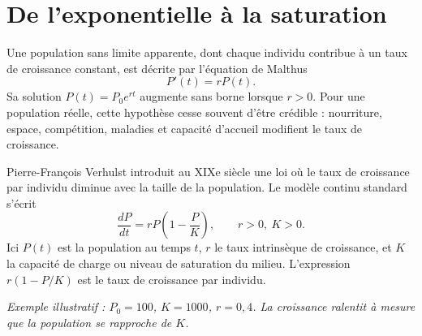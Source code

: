 


\section*{De l'exponentielle à la saturation}
Une population sans limite apparente, dont chaque individu contribue à un taux de croissance constant, est décrite par l'équation de Malthus
\[
 P'(t)=rP(t).
\]
Sa solution $P(t)=P_0e^{rt}$ augmente sans borne lorsque $r>0$. Pour une population réelle, cette hypothèse cesse souvent d'être crédible : nourriture, espace, compétition, maladies et capacité d'accueil modifient le taux de croissance.

Pierre-François Verhulst introduit au XIXe siècle une loi où le taux de croissance par individu diminue avec la taille de la population. Le modèle continu standard s'écrit
\begin{equation}\label{eq:logistic}
 \boxed{\frac{dP}{dt}=rP\left(1-\frac{P}{K}\right)},\qquad r>0,\ K>0.
\end{equation}
Ici $P(t)$ est la population au temps $t$, $r$ le taux intrinsèque de croissance, et $K$ la capacité de charge ou niveau de saturation du milieu. L'expression $r(1-P/K)$ est le taux de croissance par individu.

\begin{center}
\end{center}
\textit{Exemple illustratif : $P_0=100$, $K=1000$, $r=0{,}4$. La croissance ralentit à mesure que la population se rapproche de $K$.}


